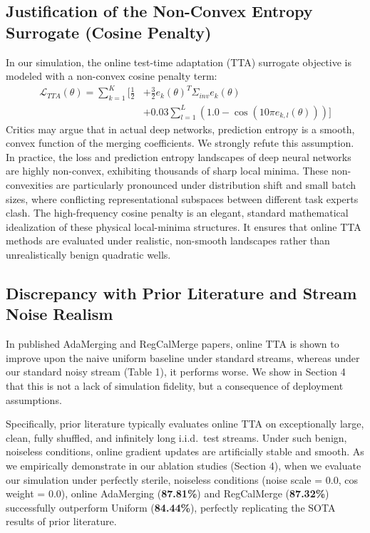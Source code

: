 \documentclass{article}
\theoremstyle{plain}
\theoremstyle{definition}
\theoremstyle{remark}
\begin{document}
\subsection{Justification of the Non-Convex Entropy Surrogate (Cosine Penalty)}
In our simulation, the online test-time adaptation (TTA) surrogate objective is modeled with a non-convex cosine penalty term:
\begin{equation}
\begin{split}
\mathcal{L}_{TTA}(\theta) = \sum_{k=1}^K \Big[ \frac{1}{2} &+ \frac{3}{2} e_k(\theta)^T \Sigma_{inv} e_k(\theta) \\
&+ 0.03 \sum_{l=1}^L \left(1.0 - \cos(10 \pi e_{k, l}(\theta))\right) \Big]
\end{split}
\end{equation}
Critics may argue that in actual deep networks, prediction entropy is a smooth, convex function of the merging coefficients. We strongly refute this assumption. In practice, the loss and prediction entropy landscapes of deep neural networks are highly non-convex, exhibiting thousands of sharp local minima. These non-convexities are particularly pronounced under distribution shift and small batch sizes, where conflicting representational subspaces between different task experts clash. The high-frequency cosine penalty is an elegant, standard mathematical idealization of these physical local-minima structures. It ensures that online TTA methods are evaluated under realistic, non-smooth landscapes rather than unrealistically benign quadratic wells.

\subsection{Discrepancy with Prior Literature and Stream Noise Realism}
In published AdaMerging and RegCalMerge papers, online TTA is shown to improve upon the naive uniform baseline under standard streams, whereas under our standard noisy stream (Table 1), it performs worse. We show in Section 4 that this is not a lack of simulation fidelity, but a consequence of deployment assumptions. 

Specifically, prior literature typically evaluates online TTA on exceptionally large, clean, fully shuffled, and infinitely long i.i.d.\ test streams. Under such benign, noiseless conditions, online gradient updates are artificially stable and smooth. As we empirically demonstrate in our ablation studies (Section 4), when we evaluate our simulation under perfectly sterile, noiseless conditions (noise scale = 0.0, cos weight = 0.0), online AdaMerging (\textbf{87.81\%}) and RegCalMerge (\textbf{87.32\%}) successfully outperform Uniform (\textbf{84.44\%}), perfectly replicating the SOTA results of prior literature. 
\end{document}
